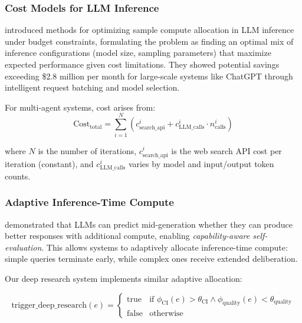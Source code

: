 \subsubsection{Cost Models for LLM Inference}

\citet{osca_inference} introduced methods for optimizing sample compute allocation in LLM inference under budget constraints, formulating the problem as finding an optimal mix of inference configurations (model size, sampling parameters) that maximize expected performance given cost limitations. They showed potential savings exceeding \$2.8 million per month for large-scale systems like ChatGPT through intelligent request batching and model selection.

For multi-agent systems, cost arises from:
\begin{equation}
\text{Cost}_{\text{total}} = \sum_{i=1}^{N} \left( c_{\text{search\_api}}^i + c_{\text{LLM\_calls}}^i \cdot n_{\text{calls}}^i \right)
\label{eq:total_cost}
\end{equation}

where $N$ is the number of iterations, $c_{\text{search\_api}}^i$ is the web search API cost per iteration (constant), and $c_{\text{LLM\_calls}}^i$ varies by model and input/output token counts.

\subsubsection{Adaptive Inference-Time Compute}

\citet{adaptive_inference_compute} demonstrated that LLMs can predict mid-generation whether they can produce better responses with additional compute, enabling \textit{capability-aware self-evaluation}. This allows systems to adaptively allocate inference-time compute: simple queries terminate early, while complex ones receive extended deliberation.

Our deep research system implements similar adaptive allocation:

\begin{equation}
\text{trigger\_deep\_research}(e) = \begin{cases}
    \text{true} & \text{if } \phi_{\text{CI}}(e) > \theta_{\text{CI}} \land \phi_{\text{quality}}(e) < \theta_{\text{quality}} \\
    \text{false} & \text{otherwise}
\end{cases}
\label{eq:trigger_deep_research}
\end{equation}

